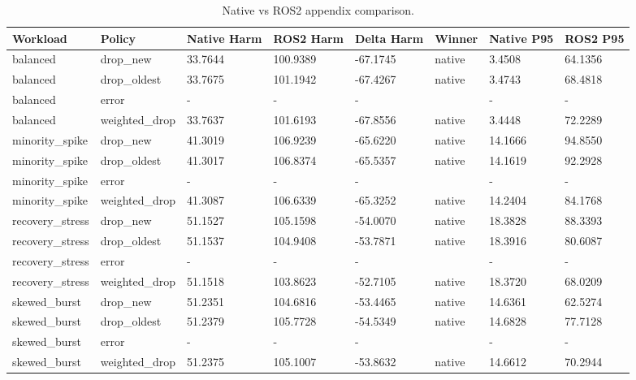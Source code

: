 \begin{table}[t]
\centering
\caption{Native vs ROS2 appendix comparison.}
\label{tab:ros2_appendix_compare}
\begin{tabular}{llllllll}
\hline
Workload & Policy & Native Harm & ROS2 Harm & Delta Harm & Winner & Native P95 & ROS2 P95 \\
\hline
balanced & drop\_new & 33.7644 & 100.9389 & -67.1745 & native & 3.4508 & 64.1356 \\
balanced & drop\_oldest & 33.7675 & 101.1942 & -67.4267 & native & 3.4743 & 68.4818 \\
balanced & error & - & - & - &  & - & - \\
balanced & weighted\_drop & 33.7637 & 101.6193 & -67.8556 & native & 3.4448 & 72.2289 \\
minority\_spike & drop\_new & 41.3019 & 106.9239 & -65.6220 & native & 14.1666 & 94.8550 \\
minority\_spike & drop\_oldest & 41.3017 & 106.8374 & -65.5357 & native & 14.1619 & 92.2928 \\
minority\_spike & error & - & - & - &  & - & - \\
minority\_spike & weighted\_drop & 41.3087 & 106.6339 & -65.3252 & native & 14.2404 & 84.1768 \\
recovery\_stress & drop\_new & 51.1527 & 105.1598 & -54.0070 & native & 18.3828 & 88.3393 \\
recovery\_stress & drop\_oldest & 51.1537 & 104.9408 & -53.7871 & native & 18.3916 & 80.6087 \\
recovery\_stress & error & - & - & - &  & - & - \\
recovery\_stress & weighted\_drop & 51.1518 & 103.8623 & -52.7105 & native & 18.3720 & 68.0209 \\
skewed\_burst & drop\_new & 51.2351 & 104.6816 & -53.4465 & native & 14.6361 & 62.5274 \\
skewed\_burst & drop\_oldest & 51.2379 & 105.7728 & -54.5349 & native & 14.6828 & 77.7128 \\
skewed\_burst & error & - & - & - &  & - & - \\
skewed\_burst & weighted\_drop & 51.2375 & 105.1007 & -53.8632 & native & 14.6612 & 70.2944 \\
\hline
\end{tabular}
\end{table}

